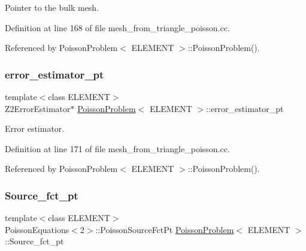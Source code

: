 Pointer to the bulk mesh. 



Definition at line 168 of file mesh\+\_\+from\+\_\+triangle\+\_\+poisson.\+cc.



Referenced by Poisson\+Problem$<$ E\+L\+E\+M\+E\+N\+T $>$\+::\+Poisson\+Problem().

\mbox{\label{classPoissonProblem_a63fc4a21e050c0b3d2ba16829af232e8}} 
\subsubsection{\texorpdfstring{error\+\_\+estimator\+\_\+pt}{error\_estimator\_pt}}
{\footnotesize\ttfamily template$<$class E\+L\+E\+M\+E\+NT$>$ \\
Z2\+Error\+Estimator$\ast$ \hyperlink{classPoissonProblem}{Poisson\+Problem}$<$ E\+L\+E\+M\+E\+NT $>$\+::error\+\_\+estimator\+\_\+pt\hspace{0.3cm}{\ttfamily [private]}}



Error estimator. 



Definition at line 171 of file mesh\+\_\+from\+\_\+triangle\+\_\+poisson.\+cc.



Referenced by Poisson\+Problem$<$ E\+L\+E\+M\+E\+N\+T $>$\+::\+Poisson\+Problem().

\mbox{\label{classPoissonProblem_a32b954cca3c38175d0816f92e1c0da46}} 
\subsubsection{\texorpdfstring{Source\+\_\+fct\+\_\+pt}{Source\_fct\_pt}}
{\footnotesize\ttfamily template$<$class E\+L\+E\+M\+E\+NT$>$ \\
Poisson\+Equations$<$2$>$\+::Poisson\+Source\+Fct\+Pt \hyperlink{classPoissonProblem}{Poisson\+Problem}$<$ E\+L\+E\+M\+E\+NT $>$\+::Source\+\_\+fct\+\_\+pt\hspace{0.3cm}{\ttfamily [private]}}



